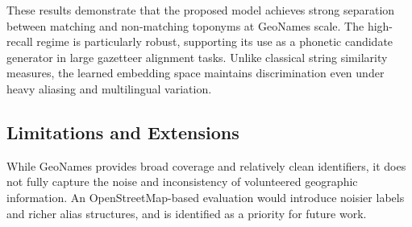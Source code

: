 These results demonstrate that the proposed model achieves strong separation between matching and
non-matching toponyms at GeoNames scale. The high-recall regime is particularly robust, supporting
its use as a phonetic candidate generator in large gazetteer alignment tasks. Unlike classical
string similarity measures, the learned embedding space maintains discrimination even under heavy
aliasing and multilingual variation.

\subsection{Limitations and Extensions}

While GeoNames provides broad coverage and relatively clean identifiers, it does not fully capture
the noise and inconsistency of volunteered geographic information. An OpenStreetMap-based evaluation
would introduce noisier labels and richer alias structures, and is identified as a priority for
future work.